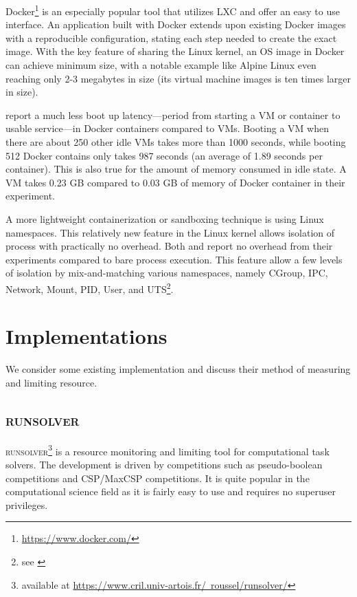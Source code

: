 Docker\footnote{\href{https://www.docker.com/}{https://www.docker.com/}} is an especially popular tool that utilizes LXC and offer an easy to use interface.
An application built with Docker extends upon existing Docker images with a reproducible  configuration, stating each step needed to create the exact image.
With the key feature of sharing the Linux kernel, an OS image in Docker can achieve minimum size, with a notable example like Alpine Linux even reaching only 2-3 megabytes in size (its virtual machine images is ten times larger in size).

\citet{zhangComparativeStudyContainers2018} report a much less boot up latency---period from starting a VM or container to usable service---in Docker containers compared to VMs.
Booting a VM when there are about 250 other idle VMs takes more than 1000 seconds, while booting 512 Docker contains only takes 987 seconds (an average of 1.89 seconds per container).
This is also true for the amount of memory consumed in idle state.
A VM takes 0.23 GB compared to 0.03 GB of memory of Docker container in their experiment.

A more lightweight containerization or sandboxing technique is using Linux namespaces.
This relatively new feature in the Linux kernel allows isolation of process with practically no overhead.
Both \citet{beyerReliableBenchmarkingRequirements2019} and \citet{marevs2012new} report no overhead from their experiments compared to bare process execution.
This feature allow a few levels of isolation by mix-and-matching various namespaces, namely CGroup, IPC, Network, Mount, PID, User, and UTS\footnote{see \href{http://man7.org/linux/man-pages/man7/namespaces.7.html}{}}.

\section{Implementations}
\label{sec:resource.impl}

We consider some existing implementation and discuss their method of measuring and limiting resource.

\subsection{\textsc{runsolver}}
\label{sec:resource.impl.runsolver}

\textsc{runsolver}\footnote{available at \href{https://www.cril.univ-artois.fr/~roussel/runsolver/}{https://www.cril.univ-artois.fr/~roussel/runsolver/}} \citep{rousselControllingSolverExecution2011} is a resource monitoring and limiting tool for computational task solvers.
The development is driven by competitions such as pseudo-boolean competitions and CSP/MaxCSP competitions.
It is quite popular in the computational science field as it is fairly easy to use and requires no superuser privileges.

